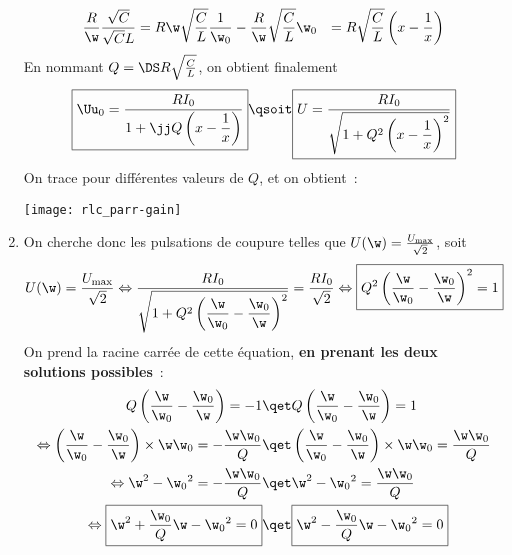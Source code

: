 \documentclass[a4paper, 12pt, final, garamond]{book}
\begin{document}
\begin{enumerate}
\begin{align*}
                    \frac{R}{\w}\frac{\sqrt{C}}{\sqrt{C}L}
                & = R\w \sqrt{\frac{C}{L}} \frac{1}{\w_0} -
                    \frac{R}{\w} \sqrt{\frac{C}{L}} \w_0
                & = R \sqrt{\frac{C}{L}} \left( x - \frac{1}{x} \right)
        \end{align*}
        En nommant $Q = \DS R \sqrt{\frac{C}{L}}$, on obtient finalement
        \begin{gather*}
            \boxed{\Uu_0 = \frac{RI_0}{1+\jj Q \left( x - \dfrac{1}{x} \right)}}
            \qsoit
            \boxed{U = \frac{RI_0}{\sqrt{1 + Q^2\left( x - \dfrac{1}{x}
            \right)^2}}}
        \end{gather*}
        On trace pour différentes valeurs de $Q$, et on obtient~:
        \begin{center}
            \texttt{[image: rlc\_parr-gain]}
        \end{center}
    \item On cherche donc les pulsations de coupure telles que $U(\w) =
        \frac{U_{\max}}{\sqrt{2}}$, soit
        \begin{gather*}
            U(\w) = \frac{U_{\max}}{\sqrt{2}}
            \Leftrightarrow
            \frac{RI_0}{\sqrt{1 + Q^2\left( \dfrac{\w}{\w_0} - \dfrac{\w_0}{\w}
                    \right)^2}}
                =
                \frac{RI_0}{\sqrt{2}}
                \Leftrightarrow
                \boxed{Q^2\left( \frac{\w}{\w_0} - \frac{\w_0}{\w} \right)^2 = 1}
        \end{gather*}
        On prend la racine carrée de cette équation, \textbf{en prenant les deux
        solutions possibles}~:
        \begin{align*}
            Q\left( \frac{\w}{\w_0} - \frac{\w_0}{\w} \right) = -1
            &\qet
            Q\left( \frac{\w}{\w_0} - \frac{\w_0}{\w} \right) = 1\\
            \Leftrightarrow
            \left( \frac{\w}{\w_0} - \frac{\w_0}{\w} \right)\times \w\w_0 =
                - \frac{\w\w_0}{Q}
            &\qet
            \left( \frac{\w}{\w_0} - \frac{\w_0}{\w} \right)\times \w\w_0 =
                \frac{\w\w_0}{Q}\\
            \Leftrightarrow
            \w^2 - \w_0{}^2 = -\frac{\w\w_0}{Q}
            &\qet
            \w^2 - \w_0{}^2 = \frac{\w\w_0}{Q}\\
            \Leftrightarrow
            \boxed{
            \w^2 + \frac{\w_0}{Q}\w - \w_0{}^2 = 0}
            &\qet
            \boxed{
            \w^2 - \frac{\w_0}{Q}\w - \w_0{}^2 = 0}\\

\end{align*}
\end{enumerate}
\end{document}
